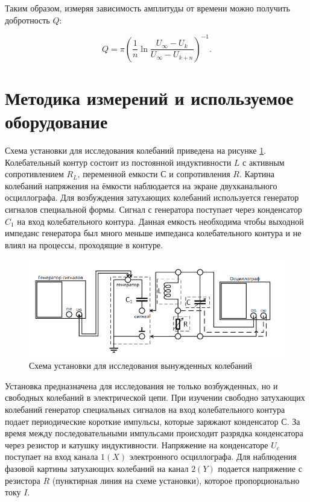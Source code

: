 \documentclass[a4paper, 12pt]{article}
\begin{document}
    Таким образом, измеряя зависимость амплитуды от времени можно получить добротность $Q$:

    \begin{equation}
        Q = \pi \left( \frac{1}{n} \ln{\frac{U_\infty - U_k}{U_\infty - U_{k+n}}} \right)^{-1}.
    \end{equation}
    
    \section{Методика измерений и используемое оборудование}

    Схема установки для исследования колебаний приведена на рисунке \ref{installation}. Колебательный контур состоит из постоянной индуктивности $L$ с активным сопротивлением $R_L$, переменной емкости $С$ и сопротивления $R$. Картина колебаний напряжения на ёмкости наблюдается на экране двухканального осциллографа. Для возбуждения затухающих колебаний используется генератор сигналов специальной формы. Сигнал с генератора поступает через конденсатор $C_1$ на вход колебательного контура. Данная емкость необходима чтобы выходной импеданс генератора был много меньше импеданса колебательного контура и не влиял на процессы, проходящие в контуре.


    \begin{figure}[H]
        \centering
        \includegraphics[scale = 0.8]{images/installation.png}
        \caption{ Схема установки для исследования вынужденных колебаний}
        \label{installation}
    \end{figure}
    
    Установка предназначена для исследования не только возбужденных, но и свободных колебаний в электрической цепи. При изучении свободно затухающих колебаний генератор специальных сигналов на вход колебательного контура подает периодические короткие импульсы, которые заряжают конденсатор $С$. За время между последовательными импульсами происходит разрядка конденсатора через резистор и катушку индуктивности. Напряжение на конденсаторе $U_c$ поступает на вход канала $1(X)$ электронного осциллографа. Для наблюдения фазовой картины затухающих колебаний на канал $2(Y)$ подается напряжение с резистора $R$ (пунктирная линия на схеме установки), которое пропорционально току $I$.
    
\end{document}
